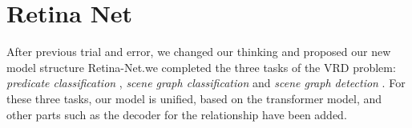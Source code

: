 %
%
%



\section{Retina Net}
\label{sec:retinanet}
After previous trial and error, we changed our thinking and proposed our new model structure Retina-Net.we completed the three tasks of the VRD problem: \textit{predicate classification} , \textit{scene graph classification} and \textit{scene graph detection} . For these three tasks, our model is unified, based on the transformer model, and other parts such as the decoder for the relationship have been added.

